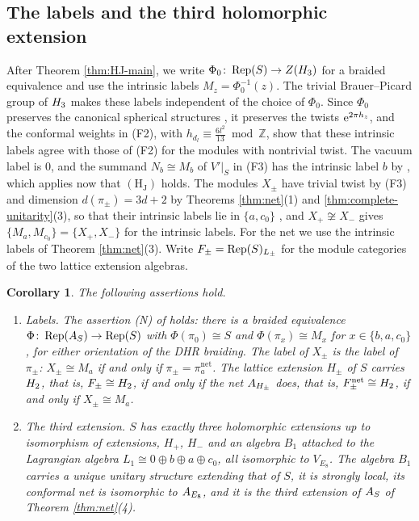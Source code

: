 \documentclass[leqno]{article}
\let\cal\relax
\newcommand{\cal}{\mathcal}
\newcommand{\Z}{\ensuremath{\mathbb{Z}}}
\newcommand{\co}{\colon}
\let\i\relax
\newcommand{\i}{\mathrm{i}}
\newcommand{\e}{\mathrm{e}}
\DeclareMathOperator{\Rep}{Rep}
\newtheorem{cor}[thm]{Corollary}
\numberwithin{equation}{section}
\begin{document}
\subsection{The labels and the third holomorphic extension}

After Theorem \ref{thm:HJ-main}, we write $\Phi_0\co\Rep(S)\to Z(\cal H_3)$ for a braided equivalence and use the intrinsic labels $M_z=\Phi_0^{-1}(z)$. The trivial Brauer--Picard group of $\cal H_3$ makes these labels independent of the choice of $\Phi_0$. Since $\Phi_0$ preserves the canonical spherical structures \cite[Proposition 8.23 p.~34]{ENO05}, it preserves the twists $\e^{2\pi\i h_z}$, and the conformal weights in (F2), with $h_{d_l} \equiv \frac{6l^2}{13} \bmod \Z$, show that these intrinsic labels agree with those of (F2) for the modules with nontrivial twist. The vacuum label is $0$, and the summand $N_b \cong M_b$ of $V'|_S$ in (F3) has the intrinsic label $b$ by \cite[Lemma 5.4]{ArhII}, which applies now that $\mathrm{(H_J)}$ holds. The modules $X_\pm$ have trivial twist by (F3) and dimension $d(\pi_\pm) = 3d+2$ by Theorems \ref{thm:net}(1) and \ref{thm:complete-unitarity}(3), so that their intrinsic labels lie in $\{a,c_0\}$ \cite[Section 2.2]{ArhII}, and $X_+ \not\cong X_-$ gives $\{M_a,M_{c_0}\}=\{X_+,X_-\}$ for the intrinsic labels. For the net we use the intrinsic labels of Theorem \ref{thm:net}(3). Write $\cal F_\pm=\Rep(S)_{L_\pm}$ for the module categories of the two lattice extension algebras.

\begin{cor}
\label{cor:S-consequences}
The following assertions hold.
\begin{enumerate}
\item \emph{Labels.} The assertion \textup{(N)} of \cite[Section 7]{ArhII} holds: there is a braided equivalence $\Phi \co \Rep(\cal A_S) \to \Rep(S)$ with $\Phi(\pi_0) \cong S$ and $\Phi(\pi_x) \cong M_x$ for $x \in \{b,a,c_0\}$, for either orientation of the DHR braiding. The label of $X_\pm$ is the label of $\pi_\pm$: $X_\pm \cong M_a$ if and only if $\pi_\pm = \pi^{\mathrm{net}}_a$. The lattice extension $H_\pm$ of $S$ carries $\cal H_2$, that is, $\cal F_\pm \cong \cal H_2$, if and only if the net $\cal A_{H_\pm}$ does, that is, $\cal F^{\mathrm{net}}_\pm \cong \cal H_2$, if and only if $X_\pm \cong M_a$.
\item \emph{The third extension.} $S$ has exactly three holomorphic extensions up to isomorphism of extensions, $H_+$, $H_-$ and an algebra $B_1$ attached to the Lagrangian algebra $L_1 \cong 0 \oplus b \oplus a \oplus c_0$, all isomorphic to $V_{E_8}$. The algebra $B_1$ carries a unique unitary structure extending that of $S$, it is strongly local, its conformal net is isomorphic to $\cal A_{E_8}$, and it is the third extension of $\cal A_S$ of Theorem \ref{thm:net}(4).
\end{enumerate}
\end{cor}
\end{document}
